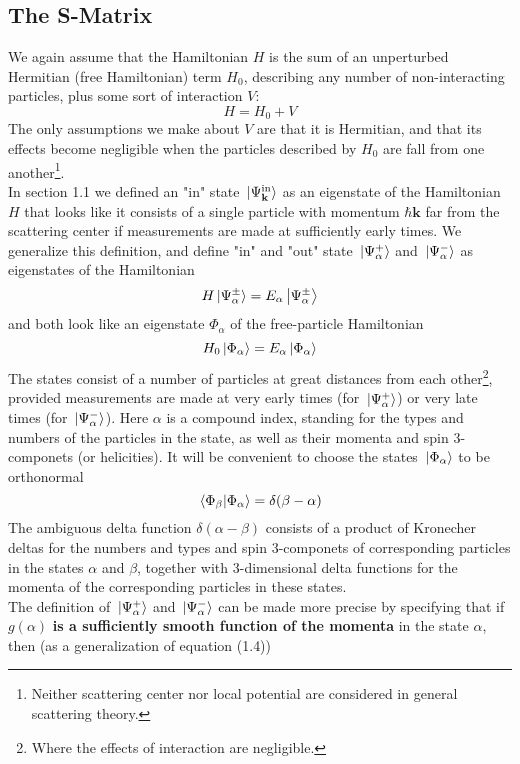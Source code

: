 \documentclass[12pt]{article}
\numberwithin{equation}{section}
\begin{document}
\subsection{The S-Matrix}
We again assume that the Hamiltonian $H$ is the sum of an unperturbed Hermitian (free Hamiltonian) term $H_0$, describing any number of non-interacting particles, plus some sort of interaction $V$:
\begin{equation}
    H = H_0 + V
\end{equation}
The only assumptions we make about $V$ are that it is Hermitian, and that its effects become negligible when the particles described by $H_0$ are fall from one another\footnote{Neither scattering center nor local potential are considered in general scattering theory.}.
\\\indent In section 1.1 we defined an "in" state $\ket*{\Psi_{\mathbf{k}}^{\text{in}}}$ as an eigenstate of the Hamiltonian $H$ that looks like it consists of a single particle with momentum $\hbar\mathbf{k}$ far from the scattering center if measurements are made at sufficiently early times.
We generalize this definition, and define "in" and "out" state $\ket*{\Psi_{\alpha}^{+}}$ and $\ket*{\Psi_{\alpha}^{-}}$ as eigenstates of the Hamiltonian
\begin{equation}
    H\ket*{\Psi_{\alpha}^{\pm}} = E_{\alpha}\ket{\Psi_{\alpha}^{\pm}}
\end{equation}
and both look like an eigenstate $\Phi_{\alpha}$ of the free-particle Hamiltonian
\begin{equation}
    H_0\ket*{\Phi_{\alpha}} = E_{\alpha}\ket*{\Phi_{\alpha}}
\end{equation}
The states consist of a number of particles at great distances from each other\footnote{Where the effects of interaction are negligible.}, provided measurements are made at very early times (for $\ket*{\Psi_{\alpha}^{+}}$) or very late times (for $\ket*{\Psi_{\alpha}^{-}}$).
Here $\alpha$ is a compound index, standing for the types and numbers of the particles in the state, as well as their momenta and spin 3-componets (or helicities).
It will be convenient to choose the states $\ket*{\Phi_{\alpha}}$ to be orthonormal
\begin{equation}
    \braket*{\Phi_{\beta}}{\Phi_{\alpha}} = \delta(\beta-\alpha)
\end{equation}
The ambiguous delta function $\delta(\alpha-\beta)$ consists of a product of Kronecher deltas for the numbers and types and spin 3-componets of corresponding particles in the states $\alpha$ and $\beta$, together with 3-dimensional delta functions for the momenta of the corresponding particles in these states.
\\\indent The definition of $\ket*{\Psi_{\alpha}^{+}}$ and $\ket*{\Psi_{\alpha}^{-}}$ can be made more precise by specifying that if $g(\alpha)$ \textbf{is a sufficiently smooth function of the momenta} in the state $\alpha$, then (as a generalization of equation (1.4))
\end{document}

